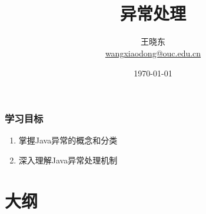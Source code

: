 
\title[KevinW@OUC]{\\  
  异常处理}
\author[王晓东]{王晓东\\
  \href{mailto:wangxiaodong@ouc.edu.cn}{\footnotesize wangxiaodong@ouc.edu.cn}}
\date{\today}


\frame{\titlepage}
\begin{frame}
  \frametitle{学习目标}
  \begin{enumerate}
  \item 掌握Java异常的概念和分类
  \item 深入理解Java异常处理机制
  \end{enumerate}  
\end{frame}

\section*{大纲}


